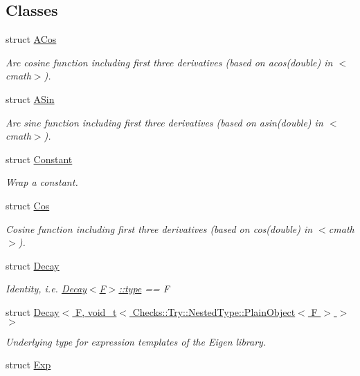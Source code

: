 \subsection*{Classes}
\begin{DoxyCompactItemize}
\item 
struct \hyperlink{structFunG_1_1ACos}{A\+Cos}
\begin{DoxyCompactList}\small\item\em Arc cosine function including first three derivatives (based on acos(double) in $<$cmath$>$). \end{DoxyCompactList}\item 
struct \hyperlink{structFunG_1_1ASin}{A\+Sin}
\begin{DoxyCompactList}\small\item\em Arc sine function including first three derivatives (based on asin(double) in $<$cmath$>$). \end{DoxyCompactList}\item 
struct \hyperlink{structFunG_1_1Constant}{Constant}
\begin{DoxyCompactList}\small\item\em Wrap a constant. \end{DoxyCompactList}\item 
struct \hyperlink{structFunG_1_1Cos}{Cos}
\begin{DoxyCompactList}\small\item\em Cosine function including first three derivatives (based on cos(double) in $<$cmath$>$). \end{DoxyCompactList}\item 
struct \hyperlink{structFunG_1_1Decay}{Decay}
\begin{DoxyCompactList}\small\item\em Identity, i.\+e. \hyperlink{structFunG_1_1Decay_a4b2916cbb7c8587ab3fccc9b896b9df4}{Decay$<$\+F$>$\+::type} == F \end{DoxyCompactList}\item 
struct \hyperlink{structFunG_1_1Decay_3_01F_00_01void__t_3_01Checks_1_1Try_1_1NestedType_1_1PlainObject_3_01F_01_4_01_4_01_4}{Decay$<$ F, void\+\_\+t$<$ Checks\+::\+Try\+::\+Nested\+Type\+::\+Plain\+Object$<$ F $>$ $>$ $>$}
\begin{DoxyCompactList}\small\item\em Underlying type for expression templates of the Eigen library. \end{DoxyCompactList}\item 
struct \hyperlink{structFunG_1_1Exp}{Exp}

\end{DoxyCompactItemize}
